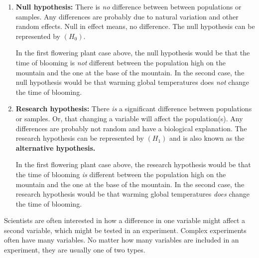 \documentclass[12pt]{exam}
\begin{document}
\begin{enumerate}
	\item \textbf{Null hypothesis:} There is \emph{no} difference between between populations or samples.
	Any differences are probably due to natural variation and other random effects. Null in effect means, no difference. The null hypothesis can be represented by $\left(H_0\right)$.
	
	In the first flowering plant case above, the null hypothesis would be that the 
	time of blooming is \emph{not} different between the population high on the mountain 
	and the one at the base of the mountain. In the second case, the null
	hypothesis would be that warming global temperatures does \emph{not} change the time
	of blooming.
	
	\item \textbf{Research hypothesis:} There \emph{is} a significant difference between populations or samples. Or,  that changing a variable will affect the population(s). Any differences are probably not random
	and have a biological explanation. The research hypothesis can be represented by $\left(H_1\right)$ and is also known as the \textbf{alternative
	hypothesis.}
	
	In the first flowering plant case above, the research hypothesis would be that the 
	time of blooming \emph{is} different between the population high on the mountain 
	and the one at the base of the mountain. In the second case, the research
	hypothesis would be that warming global temperatures \emph{does} change the time
	of blooming.

\end{enumerate}

Scientists are often interested in how a difference in one variable might 
affect a second variable, which might be tested in an experiment. Complex 
experiments often have many variables. No matter how many variables
are included in an experiment, they are usually one of two types.
\end{document}

